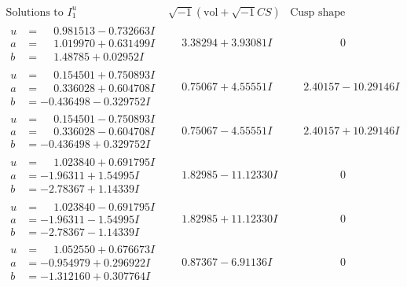 \documentclass[1p]{elsarticle_modified}
\theoremstyle{definition}
\newcommand{\I}{\sqrt{-1}}
\begin{document}
$$\begin{array}{c|c|c}
 \end{array}$$\newpage$$\begin{array}{c|c|c}  
\text{Solutions to }I^u_{1}& \I (\text{vol} + \sqrt{-1}CS) & \text{Cusp shape}\\
 \hline 
\begin{aligned}
u &= \phantom{-}0.981513 - 0.732663 I \\
a &= \phantom{-}1.019970 + 0.631499 I \\
b &= \phantom{-}1.48785 + 0.02952 I\end{aligned}
 & \phantom{-}3.38294 + 3.93081 I & \phantom{-0.000000 } 0 \\ \hline\begin{aligned}
u &= \phantom{-}0.154501 + 0.750893 I \\
a &= \phantom{-}0.336028 + 0.604708 I \\
b &= -0.436498 - 0.329752 I\end{aligned}
 & \phantom{-}0.75067 + 4.55551 I & \phantom{-}2.40157 - 10.29146 I \\ \hline\begin{aligned}
u &= \phantom{-}0.154501 - 0.750893 I \\
a &= \phantom{-}0.336028 - 0.604708 I \\
b &= -0.436498 + 0.329752 I\end{aligned}
 & \phantom{-}0.75067 - 4.55551 I & \phantom{-}2.40157 + 10.29146 I \\ \hline\begin{aligned}
u &= \phantom{-}1.023840 + 0.691795 I \\
a &= -1.96311 + 1.54995 I \\
b &= -2.78367 + 1.14339 I\end{aligned}
 & \phantom{-}1.82985 - 11.12330 I & \phantom{-0.000000 } 0 \\ \hline\begin{aligned}
u &= \phantom{-}1.023840 - 0.691795 I \\
a &= -1.96311 - 1.54995 I \\
b &= -2.78367 - 1.14339 I\end{aligned}
 & \phantom{-}1.82985 + 11.12330 I & \phantom{-0.000000 } 0 \\ \hline\begin{aligned}
u &= \phantom{-}1.052550 + 0.676673 I \\
a &= -0.954979 + 0.296922 I \\
b &= -1.312160 + 0.307764 I\end{aligned}
 & \phantom{-}0.87367 - 6.91136 I & \phantom{-0.000000 } 0 \\ \hline\begin{aligned}

\end{aligned}
\end{array}$$
\end{document}
